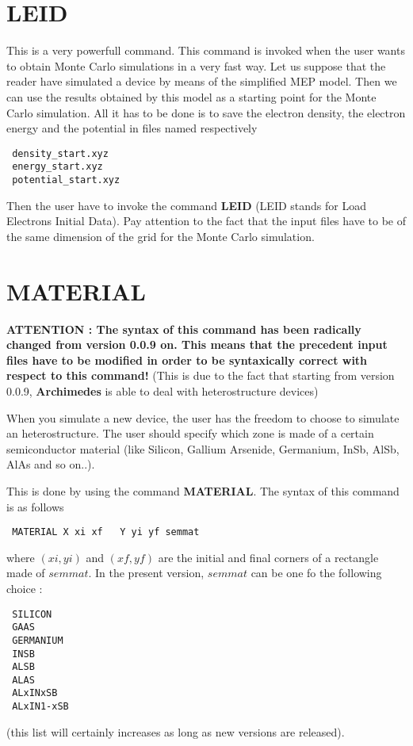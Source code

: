 \documentclass[12pt]{book}
\begin{document}
\section{LEID}
This is a very powerfull command. This command is invoked when the user wants to obtain Monte Carlo simulations in a very fast way. Let us suppose that the reader have simulated a device by means of the simplified MEP model. Then we can use the results obtained by this model as a starting point for the Monte Carlo simulation. All it has to be done is to save the electron density, the electron energy and the potential in files named respectively
\begin{verbatim}
 density_start.xyz
 energy_start.xyz
 potential_start.xyz
\end{verbatim}
Then the user have to invoke the command \textbf{LEID} (LEID stands for Load Electrons Initial Data). Pay attention to the fact that the input files have to be of the same dimension of the grid for the Monte Carlo simulation.

\section{MATERIAL}

\textbf{ATTENTION : The syntax of this command has been radically changed from version 0.0.9 on. This means that the precedent input files have to be modified in order to be syntaxically correct with respect to this command!} (This is due to the fact that starting from version 0.0.9, \textbf{Archimedes} is able to deal with heterostructure devices)

When you simulate a new device, the user has the freedom to choose to simulate an heterostructure. The user should specify which zone is made of a certain semiconductor material (like Silicon, Gallium Arsenide, Germanium, InSb, AlSb, AlAs and so on..).

This is done by using the command \textbf{MATERIAL}. The syntax of this command is as follows
\begin{verbatim}
 MATERIAL X xi xf   Y yi yf semmat
\end{verbatim}

where $(xi,yi)$ and $(xf,yf)$ are the initial and final corners of a rectangle made of $semmat$. In the present version, $semmat$ can be one fo the following choice :
\begin{verbatim}
 SILICON
 GAAS
 GERMANIUM
 INSB
 ALSB
 ALAS
 ALxINxSB
 ALxIN1-xSB
\end{verbatim}
(this list will certainly increases as long as new versions are released).
\end{document}
